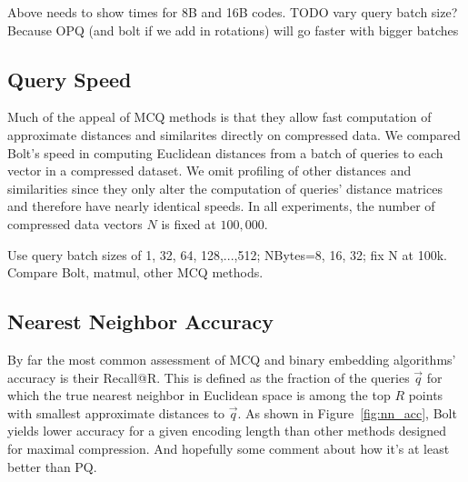 Above needs to show times for 8B and 16B codes.
TODO vary query batch size? Because OPQ (and bolt if we add in rotations) will go faster with bigger batches


\subsection{Query Speed}

Much of the appeal of MCQ methods is that they allow fast computation of approximate distances and similarites directly on compressed data. We compared Bolt's speed in computing Euclidean distances from a batch of queries to each vector in a compressed dataset. We omit profiling of other distances and similarities since they only alter the computation of queries' distance matrices and therefore have nearly identical speeds. In all experiments, the number of compressed data vectors $N$ is fixed at $100,000$.




Use query batch sizes of {1, 32, 64, 128,...,512}; NBytes={8, 16, 32}; fix N at 100k. Compare Bolt, matmul, other MCQ methods.


\subsection{Nearest Neighbor Accuracy}

By far the most common assessment of MCQ and binary embedding algorithms' accuracy is their Recall@R. This is defined as the fraction of the queries $\vec{q}$ for which the true nearest neighbor in Euclidean space is among the top $R$ points with smallest approximate distances to $\vec{q}$. As shown in Figure~\ref{fig:nn_acc}, Bolt yields lower accuracy for a given encoding length than other methods designed for maximal compression. And hopefully some comment about how it's at least better than PQ.

